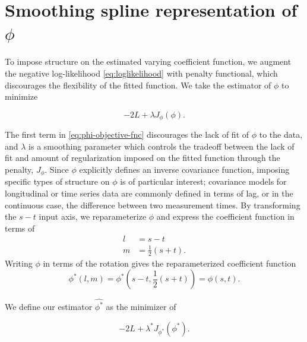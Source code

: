 \documentclass[12pt]{article}
\theoremstyle{definition}
\begin{document}
\section{Smoothing spline representation of $\phi$}

To impose structure on the estimated varying coefficient function, we augment the negative log-likelihood \ref{eq:loglikelihood} with penalty functional, which discourages the flexibility of the fitted function. We take the estimator of $\phi$ to minimize

\begin{equation} 
 -2 L + \lambda J_{\phi}\left(\phi\right)  \label{eq:phi-objective-fnc}.
\end{equation}

The first term in \ref{eq:phi-objective-fnc} discourages the lack of fit of $\phi$ to the data, and $\lambda$ is a smoothing parameter which controls the tradeoff between the lack of fit and amount of regularization imposed on the fitted function through the penalty, $J_\phi$. Since $\phi$ explicitly defines an inverse covariance function, imposing specific types of structure on $\phi$ is of particular interest; covariance models for longitudinal or time series data are commonly defined in terms of lag, or in the continuous case, the difference between two measurement times.  By transforming the $s-t$ input axis, we reparameterize $\phi$ and express the coefficient function in terms of   
\begin{align*}
l &= s-t \\
m &= \frac{1}{2}\left(s+t\right).
\end{align*}
\noindent
Writing $\phi$ in terms of the rotation gives the reparameterized coefficient function 
\begin{equation} \label{eq:phi-star}
\phi^*\left(l,m\right) = \phi^*\left(s-t, \frac{1}{2}\left(s+t\right)\right) = \phi\left(s,t\right).
\end{equation}

We define our estimator $\hat{\phi^*}$ as the minimizer of

\begin{equation} 
-2 L + \lambda^* J_{\phi^*}\left(\phi^*\right) \label{eq:phi-star-objective-fnc}.
\end{equation}
\end{document}
